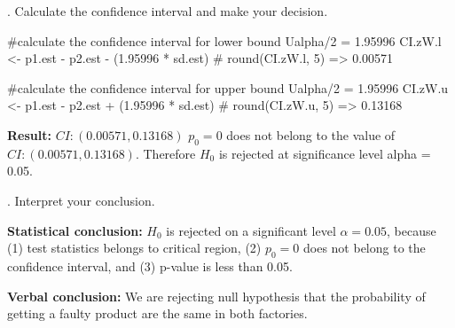 \documentclass[12pt, oneside]{report}\usepackage[]{graphicx}\usepackage[]{color}
\begin{document}
. Calculate the confidence interval and make your decision.
\begin{Schunk}
\begin{Sinput}
#calculate the confidence interval for lower bound Ualpha/2 = 1.95996
CI.zW.l <- p1.est - p2.est - (1.95996 * sd.est)
# round(CI.zW.l, 5) => 0.00571

#calculate the confidence interval for upper bound Ualpha/2 = 1.95996
CI.zW.u <- p1.est - p2.est + (1.95996 * sd.est)
# round(CI.zW.u, 5) => 0.13168
\end{Sinput}
\end{Schunk}
{\bf Result:} $CI: (0.00571, 0.13168)$ \newline
$p_0 = 0$ does not belong to the value of $CI: (0.00571, 0.13168)$. Therefore $H_0$ is rejected at significance level alpha = 0.05. \newline

. Interpret your conclusion. \newline

{\bf Statistical conclusion:} \newline
$H_0$ is rejected on a significant level $\alpha = 0.05$, because (1) test statistics belongs to critical region, (2) $p_0 = 0$ does not belong to the confidence interval, and (3) p-value is less than 0.05. \newline 

{\bf Verbal conclusion:} \newline
We are rejecting null hypothesis that the probability of getting a faulty product are the same in both factories.
\end{document}
